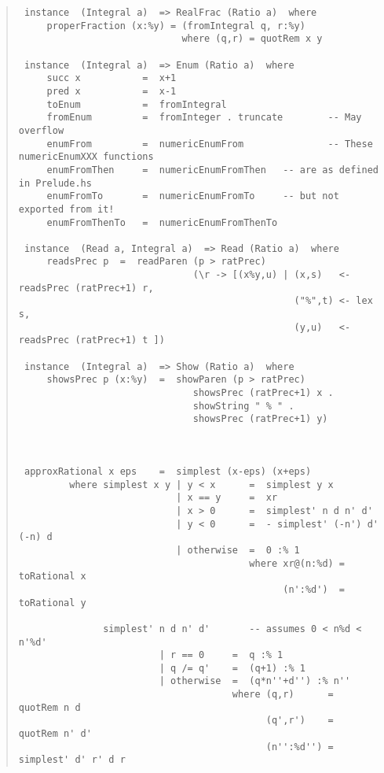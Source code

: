 \begin{quote}
{\begin{verbatim}
 instance  (Integral a)  => RealFrac (Ratio a)  where
     properFraction (x:%y) = (fromIntegral q, r:%y)
                             where (q,r) = quotRem x y
 
 instance  (Integral a)  => Enum (Ratio a)  where
     succ x           =  x+1
     pred x           =  x-1
     toEnum           =  fromIntegral
     fromEnum         =  fromInteger . truncate        -- May overflow
     enumFrom         =  numericEnumFrom               -- These numericEnumXXX functions
     enumFromThen     =  numericEnumFromThen   -- are as defined in Prelude.hs
     enumFromTo       =  numericEnumFromTo     -- but not exported from it!
     enumFromThenTo   =  numericEnumFromThenTo
 
 instance  (Read a, Integral a)  => Read (Ratio a)  where
     readsPrec p  =  readParen (p > ratPrec)
                               (\r -> [(x%y,u) | (x,s)   <- readsPrec (ratPrec+1) r,
                                                 ("%",t) <- lex s,
                                                 (y,u)   <- readsPrec (ratPrec+1) t ])
 
 instance  (Integral a)  => Show (Ratio a)  where
     showsPrec p (x:%y)  =  showParen (p > ratPrec)
                               showsPrec (ratPrec+1) x . 
                               showString " % " . 
                               showsPrec (ratPrec+1) y)
 
 
 
 approxRational x eps    =  simplest (x-eps) (x+eps)
         where simplest x y | y < x      =  simplest y x
                            | x == y     =  xr
                            | x > 0      =  simplest' n d n' d'
                            | y < 0      =  - simplest' (-n') d' (-n) d
                            | otherwise  =  0 :% 1
                                         where xr@(n:%d) = toRational x
                                               (n':%d')  = toRational y
 
               simplest' n d n' d'       -- assumes 0 < n%d < n'%d'
                         | r == 0     =  q :% 1
                         | q /= q'    =  (q+1) :% 1
                         | otherwise  =  (q*n''+d'') :% n''
                                      where (q,r)      =  quotRem n d
                                            (q',r')    =  quotRem n' d'
                                            (n'':%d'') =  simplest' d' r' d r
\end{verbatim}}
\end{quote}
